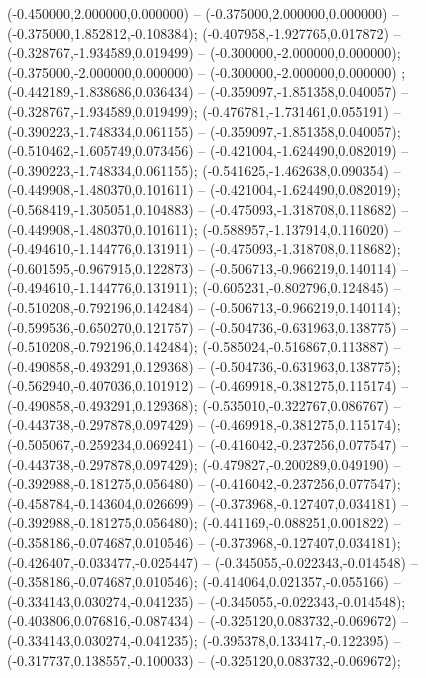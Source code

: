  (-0.450000,2.000000,0.000000) -- (-0.375000,2.000000,0.000000) -- (-0.375000,1.852812,-0.108384);
 (-0.407958,-1.927765,0.017872) -- (-0.328767,-1.934589,0.019499) -- (-0.300000,-2.000000,0.000000);
 (-0.375000,-2.000000,0.000000) -- (-0.300000,-2.000000,0.000000) ;
 (-0.442189,-1.838686,0.036434) -- (-0.359097,-1.851358,0.040057) -- (-0.328767,-1.934589,0.019499);
 (-0.476781,-1.731461,0.055191) -- (-0.390223,-1.748334,0.061155) -- (-0.359097,-1.851358,0.040057);
 (-0.510462,-1.605749,0.073456) -- (-0.421004,-1.624490,0.082019) -- (-0.390223,-1.748334,0.061155);
 (-0.541625,-1.462638,0.090354) -- (-0.449908,-1.480370,0.101611) -- (-0.421004,-1.624490,0.082019);
 (-0.568419,-1.305051,0.104883) -- (-0.475093,-1.318708,0.118682) -- (-0.449908,-1.480370,0.101611);
 (-0.588957,-1.137914,0.116020) -- (-0.494610,-1.144776,0.131911) -- (-0.475093,-1.318708,0.118682);
 (-0.601595,-0.967915,0.122873) -- (-0.506713,-0.966219,0.140114) -- (-0.494610,-1.144776,0.131911);
 (-0.605231,-0.802796,0.124845) -- (-0.510208,-0.792196,0.142484) -- (-0.506713,-0.966219,0.140114);
 (-0.599536,-0.650270,0.121757) -- (-0.504736,-0.631963,0.138775) -- (-0.510208,-0.792196,0.142484);
 (-0.585024,-0.516867,0.113887) -- (-0.490858,-0.493291,0.129368) -- (-0.504736,-0.631963,0.138775);
 (-0.562940,-0.407036,0.101912) -- (-0.469918,-0.381275,0.115174) -- (-0.490858,-0.493291,0.129368);
 (-0.535010,-0.322767,0.086767) -- (-0.443738,-0.297878,0.097429) -- (-0.469918,-0.381275,0.115174);
 (-0.505067,-0.259234,0.069241) -- (-0.416042,-0.237256,0.077547) -- (-0.443738,-0.297878,0.097429);
 (-0.479827,-0.200289,0.049190) -- (-0.392988,-0.181275,0.056480) -- (-0.416042,-0.237256,0.077547);
 (-0.458784,-0.143604,0.026699) -- (-0.373968,-0.127407,0.034181) -- (-0.392988,-0.181275,0.056480);
 (-0.441169,-0.088251,0.001822) -- (-0.358186,-0.074687,0.010546) -- (-0.373968,-0.127407,0.034181);
 (-0.426407,-0.033477,-0.025447) -- (-0.345055,-0.022343,-0.014548) -- (-0.358186,-0.074687,0.010546);
 (-0.414064,0.021357,-0.055166) -- (-0.334143,0.030274,-0.041235) -- (-0.345055,-0.022343,-0.014548);
 (-0.403806,0.076816,-0.087434) -- (-0.325120,0.083732,-0.069672) -- (-0.334143,0.030274,-0.041235);
 (-0.395378,0.133417,-0.122395) -- (-0.317737,0.138557,-0.100033) -- (-0.325120,0.083732,-0.069672);
